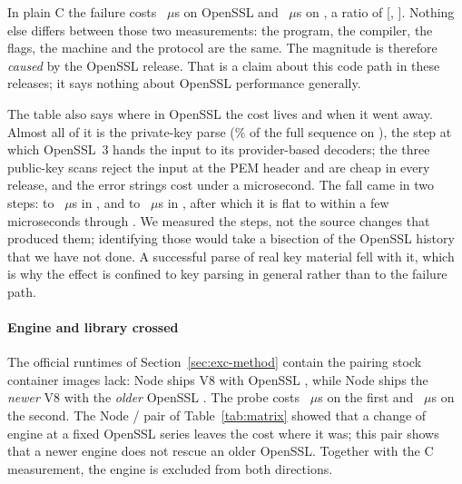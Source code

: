 \documentclass[preprint,12pt,authoryear]{elsarticle}
\begin{document}
In plain C the failure costs \CFullVThreeZeroSixteen~$\mu$s on OpenSSL \CVersionLiteralVThreeZeroSixteen{}
and \CFullVThreeFiveEight~$\mu$s on \CVersionLiteralVThreeFiveEight, a ratio of \CFullRatioOldNew{}
[\CFullRatioOldNewCiLo, \CFullRatioOldNewCiHi]. Nothing else differs between
those two measurements: the program, the compiler, the flags, the machine and
the protocol are the same. The magnitude is therefore \emph{caused} by the
OpenSSL release. That is a claim about this code path in these releases; it
says nothing about OpenSSL performance generally.

The table also says where in OpenSSL the cost lives and when it went away.
Almost all of it is the private-key parse (\CPrivateShareVThreeZeroSixteen\%
of the full sequence on \CVersionLiteralVThreeZeroSixteen{}), the step at which OpenSSL~3 hands the input
to its provider-based decoders; the three public-key scans reject the input at
the PEM header and are cheap in every release, and the error strings cost under
a microsecond. The fall came in two steps: to \CFullVThreeOneEight~$\mu$s in
\CVersionLiteralVThreeOneEight, and to \CFullVThreeTwoSix~$\mu$s in \CVersionLiteralVThreeTwoSix, after which it is flat to
within a few microseconds through \CProbeVersionLast. We measured the steps,
not the source changes that produced them; identifying those would take a
bisection of the OpenSSL history that we have not done. A successful parse of
real key material fell with it, which is why the effect is confined to key
parsing in general rather than to the failure path.

\paragraph{Engine and library crossed} The official runtimes of
Section~\ref{sec:exc-method} contain the pairing stock container images lack:
Node \RtTwentyTwoLiteral{} ships V8 \RtTwentyTwoVeightFull{} with OpenSSL
\RtTwentyTwoOpenssl, while Node \RtTwentyThreeLiteral{} ships the \emph{newer}
V8 \RtTwentyThreeVeightFull{} with the \emph{older} OpenSSL
\RtTwentyThreeOpenssl. The probe costs \RtTwentyTwoProbe~$\mu$s on the first
and \RtTwentyThreeProbe~$\mu$s on the second. The Node \NodeEighteenNodeMajor/\NodeTwentyNodeMajor{} pair of
Table~\ref{tab:matrix} showed that a change of engine at a fixed OpenSSL series
leaves the cost where it was; this pair shows that a newer engine does not
rescue an older OpenSSL. Together with the C measurement, the engine is
excluded from both directions.
\end{document}
